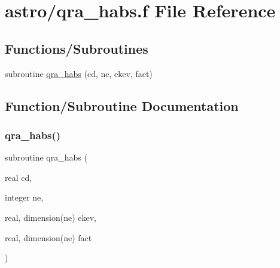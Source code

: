 \hypertarget{qra__habs_8f}{}\section{astro/qra\+\_\+habs.f File Reference}
\label{qra__habs_8f}
\subsection*{Functions/\+Subroutines}
\begin{DoxyCompactItemize}
\item 
subroutine \hyperlink{qra__habs_8f_ac89f48bfba57d5e21cbb7f2ce92eb914}{qra\+\_\+habs} (cd, ne, ekev, fact)
\end{DoxyCompactItemize}


\subsection{Function/\+Subroutine Documentation}
\mbox{\label{qra__habs_8f_ac89f48bfba57d5e21cbb7f2ce92eb914}} 
\subsubsection{\texorpdfstring{qra\+\_\+habs()}{qra\_habs()}}
{\footnotesize\ttfamily subroutine qra\+\_\+habs (\begin{DoxyParamCaption}\item[{real}]{cd,  }\item[{integer}]{ne,  }\item[{real, dimension(ne)}]{ekev,  }\item[{real, dimension(ne)}]{fact }\end{DoxyParamCaption})}

